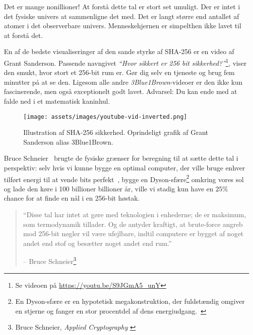 Det er mange nonillioner! At forstå dette tal er stort set umuligt. Der er
intet i det fysiske univers at sammenligne det med. Det er langt større end 
antallet af atomer i det observerbare univers. Menneskehjernen er simpelthen 
ikke lavet til at forstå det.

\newpage

En af de bedste visualiseringer af den sande styrke af SHA-256 er en video af 
Grant Sanderson. Passende navngivet \textit{\enquote{Hvor sikkert er 256 bit 
sikkerhed?}}\footnote{Se videoen på \url{https://youtu.be/S9JGmA5_unY}}, 
viser den smukt, hvor stort et 256-bit rum er. Gør dig selv en tjeneste og 
brug fem minutter på at se den. Ligesom alle andre \textit{3Blue1Brown}-videoer 
er den ikke kun fascinerende, men også exceptionelt godt lavet. Advarsel: 
Du kan ende med at falde ned i et matematisk kaninhul.

\begin{figure}[htbp]
  \centering
  \texttt{[image: assets/images/youtube-vid-inverted.png]}
  \caption{Illustration af SHA-256 sikkerhed. Oprindeligt grafik af Grant 
  Sanderson alias 3Blue1Brown.}
  \label{fig:youtube-vid-inverted}
\end{figure}

Bruce Schneier~\cite{web:schneier} brugte de fysiske grænser for beregning til 
at sætte dette tal i perspektiv: selv hvis vi kunne bygge en optimal computer, 
der ville bruge enhver tilført energi til at vende bits 
perfekt~\cite{wiki:landauer}, bygge en Dyson-sfære\footnote{En Dyson-sfære er 
en hypotetisk megakonstruktion, der fuldstændig omgiver en stjerne og fanger 
en stor procentdel af dens energiudgang.~\cite{wiki:dyson}} omkring vores sol 
og lade den køre i 100 billioner billioner år, ville vi stadig kun have en 
$25\%$ chance for at finde en nål i en 256-bit høstak.

\begin{quotation}\begin{samepage}
  \enquote{Disse tal har intet at gøre med teknologien i enhederne;
  de er maksimum, som termodynamik tillader. Og
  de antyder kraftigt, at brute-force angreb mod 256-bit nøgler vil være
  ufejlbare, indtil computere er bygget af noget andet end stof
  og besætter noget andet end rum.}
  \begin{flushright} -- Bruce Schneier\footnote{Bruce Schneier, 
    \textit{Applied Cryptography} \cite{bruce-schneier}}
  \end{flushright}\end{samepage}\end{quotation}
  
